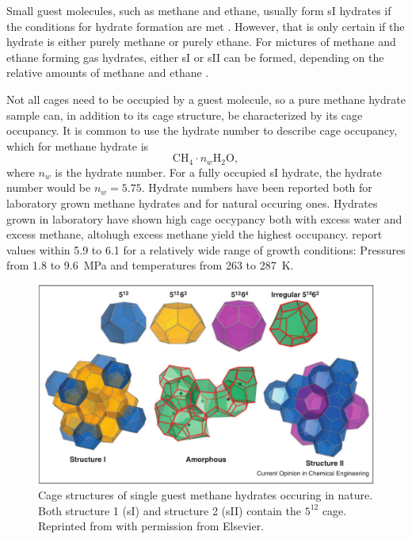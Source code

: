 Small guest molecules, such as methane and ethane, usually form sI hydrates if the conditions for hydrate formation are met \cite{Hester2009}. However, that is only certain if the hydrate is either purely methane or purely ethane. For mictures of methane and ethane forming gas hydrates, either sI or sII can be formed, depending on the relative amounts of methane and ethane \cite{Subramanian20001981}. 

Not all cages need to be occupied by a guest molecule, so a pure methane hydrate sample can, in addition to its cage structure, be characterized by its cage occupancy. It is common to use the hydrate number to describe cage occupancy, which for methane hydrate is
%
\begin{equation}
	\mathrm{CH_4} \cdot n_w \mathrm{H_2O},
\end{equation}
%
where $n_w$ is the hydrate number. For a fully occupied sI hydrate, the hydrate number would be $n_w = 5.75$. Hydrate numbers have been reported both for laboratory grown methane hydrates and for natural occuring ones. Hydrates grown in laboratory have shown high cage occypancy both with excess water and excess methane, altohugh excess methane yield the highest occupancy. \citet{Circone2005} report values within 5.9 to 6.1 for a relatively wide range of growth conditions: Pressures from 1.8 to \SI{9.6}{\mega\pascal} and temperatures from 263 to \SI{287}{\kelvin}. 

\begin{figure}
\includegraphics[width=15cm]{../pictures/hydrate_structures.png}
\caption{Cage structures of single guest methane hydrates occuring in nature. Both structure 1 (sI) and structure 2 (sII) contain the $5^{12}$ cage. Reprinted from \citet{Barnes2013} with permission from Elsevier.}
\label{fig:methane_hydrate_structure}
\end{figure}


